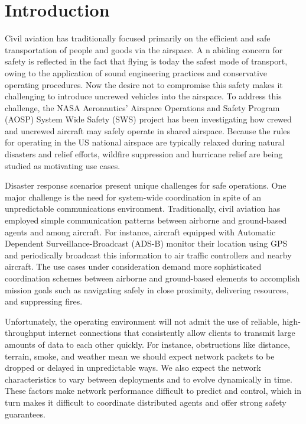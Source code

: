 \section{Introduction}
\label{sec:introduction}

Civil aviation has traditionally focused primarily on the efficient
and safe transportation of people and goods via the airspace. A n
abiding concern for safety is reflected in the fact that flying is
today the safest mode of transport, owing to the application of sound
engineering practices and conservative operating procedures. Now the
desire not to compromise this safety makes it challenging to introduce
uncrewed vehicles into the airspace. To address this challenge, the
NASA Aeronautics' Airspace Operations and Safety Program (AOSP) System
Wide Safety (SWS) project has been investigating how crewed and
uncrewed aircraft may safely operate in shared airspace. Because the
rules for operating in the US national airspace are typically relaxed
during natural disasters and relief efforts, wildfire suppression and
hurricane relief are being studied as motivating use cases.

Disaster response scenarios present unique challenges for safe
operations. One major challenge is the need for system-wide
coordination in spite of an unpredictable communications
environment. Traditionally, civil aviation has employed simple
communication patterns between airborne and ground-based agents and
among aircraft. For instance, aircraft equipped with Automatic
Dependent Surveillance-Broadcast (ADS-B) monitor their location using
GPS and periodically broadcast this information to air traffic
controllers and nearby aircraft. The use cases under consideration
demand more sophisticated coordination schemes between airborne and
ground-based elements to accomplish mission goals such as navigating
safely in close proximity, delivering resources, and suppressing
fires.

Unfortunately, the operating environment will not admit the use of
reliable, high-throughput internet connections that consistently allow
clients to transmit large amounts of data to each other quickly. For
instance, obstructions like distance, terrain, smoke, and weather mean
we should expect network packets to be dropped or delayed in
unpredictable ways. We also expect the network characteristics to vary
between deployments and to evolve dynamically in time. These factors
make network performance difficult to predict and control, which in
turn makes it difficult to coordinate distributed agents and offer
strong safety guarantees.

